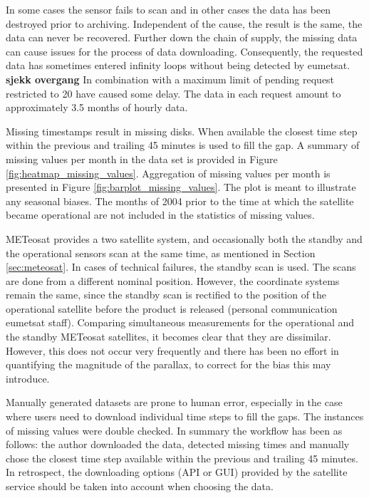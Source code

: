 In some cases the sensor fails to scan and in other cases the data has been destroyed prior to archiving. Independent of the cause, the result is the same, the data can never be recovered. Further down the chain of supply, the missing data can cause issues for the process of data downloading. Consequently, the requested data has sometimes entered infinity loops without being detected by \acrshort{eumetsat}. \textbf{sjekk overgang} In combination with 
a maximum limit of pending request restricted to 20 have caused some delay. The data in each request amount to approximately 3.5 months of hourly data. 

Missing timestamps result in missing disks. When available the closest time step within the previous and trailing 45 minutes is used to fill the gap. A summary of missing values per month in the data set is provided in Figure \ref{fig:heatmap_missing_values}. Aggregation of missing values per month is presented in Figure \ref{fig:barplot_missing_values}. The plot is meant to illustrate any seasonal biases. The months of 2004 prior to the time at which the satellite became operational are not included in the statistics of missing values.

METeosat provides a two satellite system, and occasionally both the standby and the operational sensors scan at the same time, as mentioned in Section \ref{sec:meteosat}.
In cases of technical failures, the standby scan is used. The scans are done from a different nominal position. However, the coordinate systems remain the same, since the standby scan is rectified to the position of the operational satellite before the product is released (personal communication \acrshort{eumetsat} staff). Comparing simultaneous measurements for the operational and the standby METeosat satellites, it becomes clear that they are dissimilar. However, this does not occur very frequently and there has been no effort in quantifying the magnitude of the parallax, to correct for the bias this may introduce.

Manually generated datasets are prone to human error, especially in the case where users need to download individual time steps to fill the gaps. The instances of missing values were double checked. In summary the workflow has been as follows: the author downloaded the data, detected missing times and manually chose the closest time step available within the previous and trailing 45 minutes. In retrospect, the downloading options (API or GUI) provided by the satellite service should be taken into account when choosing the data.

